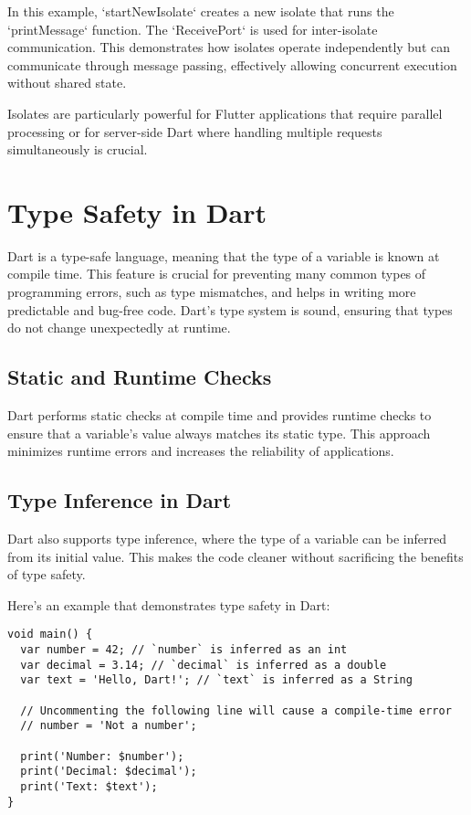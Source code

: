 \documentclass{book}
\begin{document}
In this example, `startNewIsolate` creates a new isolate that runs the `printMessage` function. The `ReceivePort` is used for inter-isolate communication. This demonstrates how isolates operate independently but can communicate through message passing, effectively allowing concurrent execution without shared state.

Isolates are particularly powerful for Flutter applications that require parallel processing or for server-side Dart where handling multiple requests simultaneously is crucial.

\chapter{Type Safety in Dart}

Dart is a type-safe language, meaning that the type of a variable is known at compile time. This feature is crucial for preventing many common types of programming errors, such as type mismatches, and helps in writing more predictable and bug-free code. Dart's type system is sound, ensuring that types do not change unexpectedly at runtime.

\section{Static and Runtime Checks}
Dart performs static checks at compile time and provides runtime checks to ensure that a variable's value always matches its static type. This approach minimizes runtime errors and increases the reliability of applications.

\section{Type Inference in Dart}
Dart also supports type inference, where the type of a variable can be inferred from its initial value. This makes the code cleaner without sacrificing the benefits of type safety.

Here's an example that demonstrates type safety in Dart:

\begin{lstlisting}[style=dartstyle]
void main() {
  var number = 42; // `number` is inferred as an int
  var decimal = 3.14; // `decimal` is inferred as a double
  var text = 'Hello, Dart!'; // `text` is inferred as a String

  // Uncommenting the following line will cause a compile-time error
  // number = 'Not a number';

  print('Number: $number');
  print('Decimal: $decimal');
  print('Text: $text');
}
\end{lstlisting}
\end{document}
